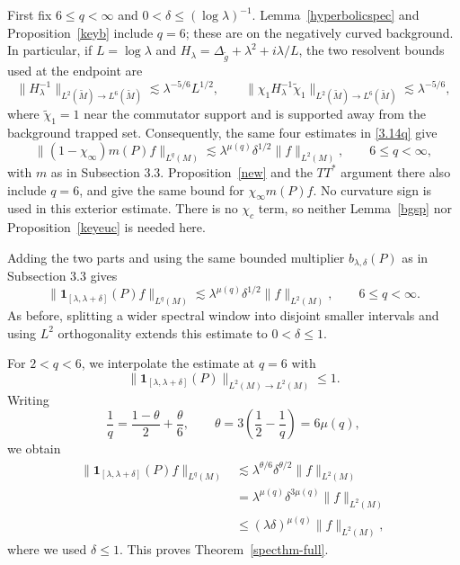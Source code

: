 \documentclass[11pt]{amsart}
\newcommand{\la}{\lambda}
\begin{document}
First fix $6\leq q<\infty$ and $0<\delta\leq(\log\la)^{-1}$. Lemma~\ref{hyperbolicspec} and Proposition~\ref{keyb} include $q=6$; these are \cite[Theorem 1.2 and Proposition 2.8]{HSTZ} on the negatively curved background. In particular, if $L=\log\la$ and $H_\la=\Delta_{\tilde g}+\la^2+i\la/L$, the two resolvent bounds used at the endpoint are
\[
\|H_\la^{-1}\|_{L^2(\tilde M)\to L^6(\tilde M)}
\lesssim\la^{-5/6}L^{1/2},\qquad
\|\chi_1H_\la^{-1}\tilde\chi_1\|_{L^2(\tilde M)\to L^6(\tilde M)}
\lesssim\la^{-5/6},
\]
where $\tilde\chi_1=1$ near the commutator support and is supported away from the background trapped set. Consequently, the same four estimates in \eqref{3.14q} give
\[
\|(1-\chi_\infty)m(P)f\|_{L^q(M)}
\lesssim\la^{\mu(q)}\delta^{1/2}\|f\|_{L^2(M)},
\qquad 6\leq q<\infty,
\]
with $m$ as in Subsection 3.3. Proposition~\ref{new} and the $TT^*$ argument there also include $q=6$, and give the same bound for $\chi_\infty m(P)f$. No curvature sign is used in this exterior estimate. There is no $\chi_c$ term, so neither Lemma~\ref{bgsp} nor Proposition~\ref{keyeuc} is needed here.

Adding the two parts and using the same bounded multiplier $b_{\la,\delta}(P)$ as in Subsection 3.3 gives
\begin{equation}\label{eq:full-supercritical}
\|\mathbf{1}_{[\la,\la+\delta]}(P)f\|_{L^q(M)}
\lesssim\la^{\mu(q)}\delta^{1/2}\|f\|_{L^2(M)},
\qquad 6\leq q<\infty.
\end{equation}
As before, splitting a wider spectral window into disjoint smaller intervals and using $L^2$ orthogonality extends this estimate to $0<\delta\leq1$.

For $2<q<6$, we interpolate the estimate at $q=6$ with
\[
\|\mathbf{1}_{[\la,\la+\delta]}(P)\|_{L^2(M)\to L^2(M)}\leq1.
\]
Writing
\[
\frac1q=\frac{1-\theta}{2}+\frac\theta6,
\qquad \theta=3\left(\frac12-\frac1q\right)=6\mu(q),
\]
we obtain
\begin{align*}
\|\mathbf{1}_{[\la,\la+\delta]}(P)f\|_{L^q(M)}
&\lesssim\la^{\theta/6}\delta^{\theta/2}\|f\|_{L^2(M)}\\
&=\la^{\mu(q)}\delta^{3\mu(q)}\|f\|_{L^2(M)}\\
&\leq(\la\delta)^{\mu(q)}\|f\|_{L^2(M)},
\end{align*}
where we used $\delta\leq1$. This proves Theorem~\ref{specthm-full}.

\printbibliography
\end{document}
